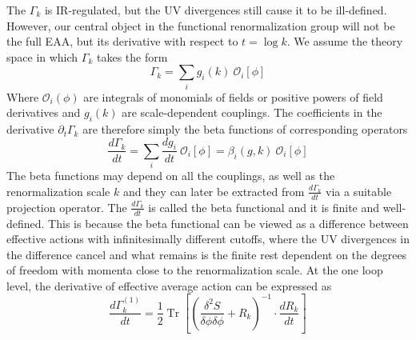 \documentclass[11pt, a4paper]{article}
\begin{document}



The $\Gamma_k$ is IR-regulated, but the UV divergences still cause it to be ill-defined. 
However, our central object in the functional renormalization group will not be the full EAA, 
but its derivative with respect to $t = \log{k}$.
We assume the theory space in which $\Gamma_k$ takes the form
\begin{equation}
    \Gamma_k = \sum_i g_i(k) \ \mathcal{O}_i [\phi]
    \label{gamma_decomp}
\end{equation}
Where $\mathcal{O}_i (\phi)$ are integrals of monomials of fields or positive powers of field derivatives 
and $g_i(k)$ are scale-dependent couplings.
The coefficients in the derivative $\partial_t \Gamma_k$ are therefore simply the beta functions of corresponding operators
\begin{equation}
    \frac{d \Gamma_k}{dt} = \sum_i \frac{d g_i}{dt} \ \mathcal{O}_i [\phi] = \beta_i(g,k) \ \mathcal{O}_i [\phi]
\end{equation}
The beta functions may depend on all the couplings, as well as the renormalization scale $k$ and
they can later be extracted from $\frac{d \Gamma_k}{dt}$ via a suitable projection operator. 
The $\frac{d \Gamma_k}{dt}$ is called the beta functional and it is finite and well-defined.
This is because the beta functional can be viewed as a difference between effective actions with infinitesimally
different cutoffs, where the UV divergences in the difference cancel and what remains is the finite rest
dependent on the degrees of freedom with momenta close to the renormalization scale.
At the one loop level, the derivative of effective average action can be expressed as
\begin{equation}
    \frac{d \Gamma_k^{(1)}}{dt} = \frac{1}{2} \operatorname{Tr} \left[ \left(\frac{\delta^2 S}{\delta \phi \delta \phi} + R_k\right)^{-1} \cdot \frac{d R_k}{dt} \right]
\end{equation}
\end{document}
